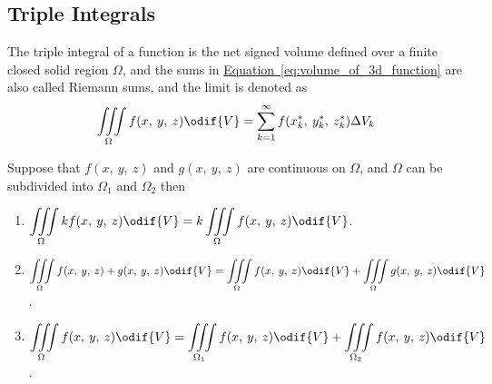 \documentclass{article}
\begin{document}
\subsection{Triple Integrals}
\begin{definition}
    The triple integral of a function is the net signed volume
    defined over a finite closed solid region \(\Omega\), and the sums in
    \hyperref[eq:volume_of_3d_function]{Equation~\ref{eq:volume_of_3d_function}}
    are also called Riemann sums, and the limit is denoted as
    \begin{equation*}
        \iiint\limits_{\Omega} f(x,\: y,\: z)  \odif{V}
        = \sum_{k=1}^{\infty} f(x_k^\ast,\: y_k^\ast,\: z_k^\ast) \Delta V_k
    \end{equation*}
\end{definition}
\begin{tcolorboxlarge}[title={Properties of Triple Integrals}]
    \begin{theorem}
        Suppose that \(f(x,\: y,\: z) \) and \(g(x,\: y,\: z)\) are continuous on \(\Omega\),
        and \(\Omega\) can be subdivided into \(\Omega_1\) and \(\Omega_2\) then
        \begin{enumerate}[label=\normalfont\alph*)] %
            \item $\displaystyle\iiint\limits_\Omega kf(x,\: y,\: z) \odif{V}
                      = k\iiint\limits_\Omega f(x,\: y,\: z) \odif{V}$.
            \item $\displaystyle\iiint\limits_\Omega f(x,\: y,\: z) + g(x,\: y,\: z) \odif{V}
                      = \iiint\limits_\Omega f(x,\: y,\: z) \odif{V} + \iiint\limits_\Omega g(x,\: y,\: z) \odif{V}$.
            \item $\displaystyle\iiint\limits_\Omega f(x,\: y,\: z) \odif{V}
                      = \iiint\limits_{\Omega_1} f(x,\: y,\: z) \odif{V} + \iiint\limits_{\Omega_2} f(x,\: y,\: z) \odif{V}$.
        \end{enumerate}
    \end{theorem}
\end{tcolorboxlarge}
\newpage
\end{document}
